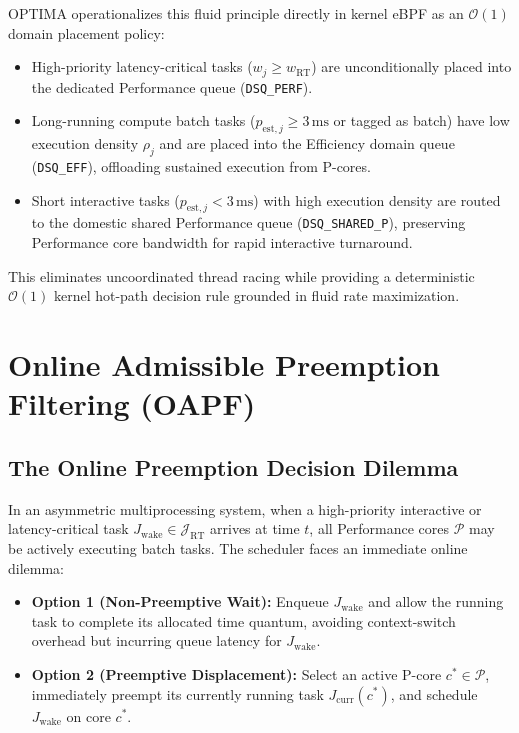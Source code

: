 \documentclass[conference]{IEEEtran}
\begin{document}
OPTIMA operationalizes this fluid principle directly in kernel eBPF as an $\mathcal{O}(1)$ domain placement policy:
\begin{itemize}
    \item High-priority latency-critical tasks ($w_j \ge w_{\mathrm{RT}}$) are unconditionally placed into the dedicated Performance queue (\texttt{DSQ\_PERF}).
    \item Long-running compute batch tasks ($p_{\mathrm{est},j} \ge 3\,\text{ms}$ or tagged as batch) have low execution density $\rho_j$ and are placed into the Efficiency domain queue (\texttt{DSQ\_EFF}), offloading sustained execution from P-cores.
    \item Short interactive tasks ($p_{\mathrm{est},j} < 3\,\text{ms}$) with high execution density are routed to the domestic shared Performance queue (\texttt{DSQ\_SHARED\_P}), preserving Performance core bandwidth for rapid interactive turnaround.
\end{itemize}
This eliminates uncoordinated thread racing while providing a deterministic $\mathcal{O}(1)$ kernel hot-path decision rule grounded in fluid rate maximization.

\section{Online Admissible Preemption Filtering (OAPF)}
\label{sec:theorem2}

\subsection{The Online Preemption Decision Dilemma}
In an asymmetric multiprocessing system, when a high-priority interactive or latency-critical task $J_{\mathrm{wake}} \in \mathcal{J}_{\mathrm{RT}}$ arrives at time $t$, all Performance cores $\mathcal{P}$ may be actively executing batch tasks. The scheduler faces an immediate online dilemma:
\begin{itemize}
    \item \textbf{Option 1 (Non-Preemptive Wait):} Enqueue $J_{\mathrm{wake}}$ and allow the running task to complete its allocated time quantum, avoiding context-switch overhead but incurring queue latency for $J_{\mathrm{wake}}$.
    \item \textbf{Option 2 (Preemptive Displacement):} Select an active P-core $c^* \in \mathcal{P}$, immediately preempt its currently running task $J_{\mathrm{curr}}(c^*)$, and schedule $J_{\mathrm{wake}}$ on core $c^*$.
\end{itemize}
\end{document}
